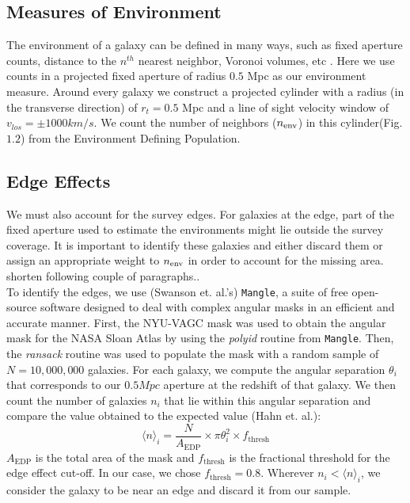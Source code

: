 \subsection{Measures of Environment}

The environment of a galaxy can be defined in many ways, such as fixed aperture counts, distance to the $n^{th}$ nearest neighbor, Voronoi volumes, etc \citep{cooper_measuring_2005}. Here we use counts in a projected fixed aperture of radius $0.5$ Mpc as our environment measure. Around every galaxy we construct a projected cylinder with a radius (in the transverse direction) of $r_{t} = 0.5$ Mpc and a line of sight velocity window of $v_{los} = \pm 1000 km/s$. We count the number of neighbors ($n_{\rm env}$) in this cylinder(Fig. $1.2$) from the Environment Defining Population.\\

\subsection{Edge Effects}\label{edge}

We must also account for the survey edges. For galaxies at the edge, part of the fixed aperture used to estimate the environments might lie outside the survey coverage. It is important to identify these galaxies and either discard them or assign an appropriate weight to $n_{\rm env}$ in order to account for the missing area. shorten following couple of paragraphs.. \\
To identify the edges, we use (Swanson et. al.'s) \texttt{Mangle}, a suite of free open-source software designed to deal with complex angular masks in an efficient and accurate manner. First, the NYU-VAGC mask was used to obtain the angular mask for the NASA Sloan Atlas by using the \emph{polyid} routine from \texttt{Mangle}. Then, the \emph{ransack} routine was used to populate the mask with a random sample of $N = 10,000,000$ galaxies. For each galaxy, we compute the angular separation $\theta_{i}$ that corresponds to our $0.5 Mpc$ aperture at the redshift of that galaxy. We then count the number of galaxies $n_{i}$ that lie within this angular separation and compare the value obtained to the expected value (Hahn et. al.): 
$$\big \langle n \big \rangle _{i} = \frac{N}{A_{\mathrm{EDP}}} \times \pi \theta_{i}^{2} \times f_{\mathrm{thresh}} $$
$A_{\mathrm{EDP}}$ is the total area of the mask and $f_{\mathrm{thresh}}$ is the fractional threshold for the edge effect cut-off. In our case, we chose $f_{\mathrm{thresh}} = 0.8$. Wherever $n_{i} < \big \langle n \big \rangle _{i} $, we consider the galaxy to be near an edge and discard it from our sample. \\



